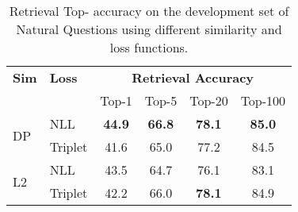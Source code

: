 \documentclass[11pt,a4paper]{article}
\newcommand\tf[1]{\textbf{#1}}
\begin{document}
 \begin{table}[t!]
    \setlength\tabcolsep{4pt}
    \centering
    \begin{tabular}{ll|cccc}
    \toprule
    \tf{Sim} & \tf{Loss} & \multicolumn{4}{c}{\tf{Retrieval Accuracy}} \\ 
    & & Top-1 & Top-5 & Top-20 & Top-100 \\ \midrule
    \multirow{2}{*}{DP} & NLL & \tf{44.9} & \tf{66.8} & \tf{78.1} & \tf{85.0} \\
    & Triplet & 41.6 & 65.0 & 77.2 & 84.5 \\
    \midrule
    \multirow{2}{*}{L2} & NLL & 43.5 & 64.7 & 76.1 & 83.1 \\
    & Triplet & 42.2 & 66.0 & \tf{78.1} & 84.9 \\ 
    \bottomrule
    \end{tabular}
     \caption{Retrieval Top- accuracy on the development set of Natural Questions using different similarity and loss functions.} 

    \label{tab:qa_ir_sim_and_loss}
\end{table}
\setlength{\tabcolsep}{6pt}  
\end{document}
